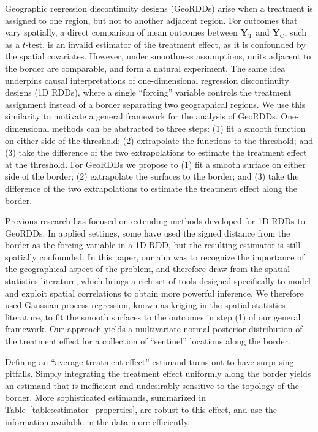 \documentclass[letter]{article}
\newcommand{\treat}{\mathrm{T}}
\newcommand{\ctrol}{\mathrm{C}}
\newcommand{\Yvec}{\mathbold{Y}}
\newcommand{\yt}{\Yvec_{\treat}}
\newcommand{\yc}{\Yvec_{\ctrol}}
\begin{document}
    	Geographic regression discontinuity designs (GeoRDDs) arise when a treatment is assigned to one region, but not to another adjacent region.
For outcomes that vary spatially, a direct comparison of mean outcomes between \(\yt\) and \(\yc\), such as a \(t\)-test, is an invalid estimator of the treatment effect, as it is confounded by the spatial covariates.
However, under smoothness assumptions, units adjacent to the border are comparable, and form a natural experiment.
The same idea underpins causal interpretations of one-dimensional regression discontinuity designs (1D RDDs), where a single ``forcing'' variable controls the treatment assignment instead of a border separating two geographical regions.
We use this similarity to motivate a general framework for the analysis of GeoRDDs.
One-dimensional methods can be abstracted to three steps: (1) fit a smooth function on either side of the threshold; (2) extrapolate the functions to the threshold; and (3) take the difference of the two extrapolations to estimate the treatment effect at the threshold.
For GeoRDDs we propose to (1) fit a smooth surface on either side of the border; (2) extrapolate the surfaces to the border; and (3) take the difference of the two extrapolations to estimate the treatment effect along the border.

Previous research has focused on extending methods developed for 1D RDDs to GeoRDDs.
In applied settings, some have used the signed distance from the border as the forcing variable in a 1D RDD, but the resulting estimator is still spatially confounded.
In this paper, our aim was to recognize the importance of the geographical aspect of the problem, and therefore draw from the spatial statistics literature, which brings a rich set of tools designed specifically to model and exploit spatial correlations to obtain more powerful inference.
We therefore used Gaussian process regression, known as kriging in the spatial statistics literature, to fit the smooth surfaces to the outcomes in step (1) of our general framework.
Our approach yields a multivariate normal posterior distribution of the treatment effect for a collection of ``sentinel'' locations along the border.
    


    	Defining an ``average treatment effect'' estimand turns out to have surprising pitfalls.
Simply integrating the treatment effect uniformly along the border yields an estimand that is inefficient and undesirably sensitive to the topology of the border.
More sophisticated estimands, summarized in Table~\ref{table:estimator_properties}, are robust to this effect, and use the information available in the data more efficiently.
\end{document}
